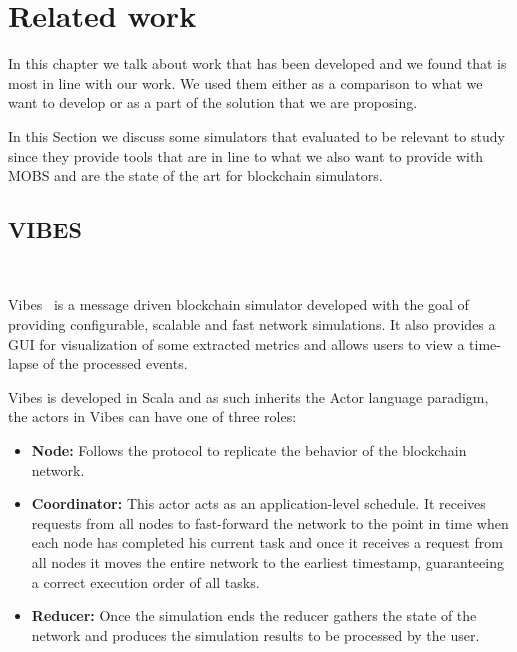 
%

\chapter{Related work}\label{cha:related_work}

In this chapter we talk about work that has been developed and we found that is most in line with our work. We used them
either as a comparison to what we want to develop or as a part of the solution that
we are proposing.

In this Section we discuss some simulators that evaluated to be relevant to study
since they provide tools that are in line to what we also want to provide with MOBS and
are the state of the art for blockchain simulators.

\section{VIBES}~\label{subsec:vibes}

Vibes~\cite{vibes} is a message driven blockchain simulator developed with the goal of providing
configurable, scalable and fast network simulations. It also provides a GUI for visualization
of some extracted metrics and allows users to view a time-lapse of the processed events.

Vibes is developed in Scala and as such inherits the Actor language paradigm, the actors in
Vibes can have one of three roles:

\begin{itemize}
  \item \textbf{Node:} Follows the protocol to replicate the behavior of the blockchain
  network.
  \item \textbf{Coordinator:} This actor acts as an application-level schedule. It receives
  requests from all nodes to fast-forward the network to the point in time when each node
  has completed his current task and once it receives a request from all nodes it moves the
  entire network to the earliest timestamp, guaranteeing a correct execution order of all tasks.
  \item \textbf{Reducer:} Once the simulation ends the reducer gathers the state of the network
  and produces the simulation results to be processed by the user.
\end{itemize}

